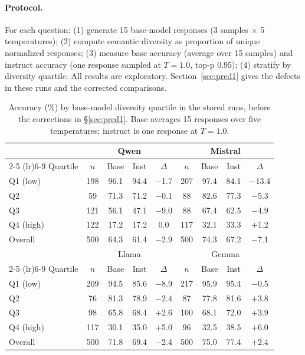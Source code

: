 \paragraph{Protocol.} For each question: (1) generate 15 base-model responses (3 samples $\times$ 5 temperatures); (2) compute semantic diversity as proportion of unique normalized responses; (3) measure base accuracy (average over 15 samples) and instruct accuracy (one response sampled at $T=1.0$, top-p 0.95); (4) stratify by diversity quartile. All results are exploratory. Section~\ref{sec:pred1} gives the defects in these runs and the corrected comparisons.

\begin{table}[h]
\centering
\small
\begin{tabular}{lcccc|cccc}
\toprule
 & \multicolumn{4}{c}{Qwen} & \multicolumn{4}{c}{Mistral} \\
\cmidrule(lr){2-5} \cmidrule(lr){6-9}
Quartile & $n$ & Base & Inst & $\Delta$ & $n$ & Base & Inst & $\Delta$ \\
\midrule
Q1 (low) & 198 & 96.1 & 94.4 & $-$1.7 & 207 & 97.4 & 84.1 & $-$13.4 \\
Q2 & 59 & 71.3 & 71.2 & $-$0.1 & 88 & 82.6 & 77.3 & $-$5.3 \\
Q3 & 121 & 56.1 & 47.1 & $-$9.0 & 88 & 67.4 & 62.5 & $-$4.9 \\
Q4 (high) & 122 & 17.2 & 17.2 & 0.0 & 117 & 32.1 & 33.3 & $+$1.2 \\
Overall & 500 & 64.3 & 61.4 & $-$2.9 & 500 & 74.3 & 67.2 & $-$7.1 \\
\midrule
 & \multicolumn{4}{c}{Llama} & \multicolumn{4}{c}{Gemma} \\
\cmidrule(lr){2-5} \cmidrule(lr){6-9}
Quartile & $n$ & Base & Inst & $\Delta$ & $n$ & Base & Inst & $\Delta$ \\
\midrule
Q1 (low) & 209 & 94.5 & 85.6 & $-$8.9 & 217 & 95.9 & 95.4 & $-$0.5 \\
Q2 & 76 & 81.3 & 78.9 & $-$2.4 & 87 & 77.8 & 81.6 & $+$3.8 \\
Q3 & 98 & 65.8 & 68.4 & $+$2.6 & 100 & 68.1 & 72.0 & $+$3.9 \\
Q4 (high) & 117 & 30.1 & 35.0 & $+$5.0 & 96 & 32.5 & 38.5 & $+$6.0 \\
Overall & 500 & 71.8 & 69.4 & $-$2.4 & 500 & 75.0 & 77.4 & $+$2.4 \\
\bottomrule
\end{tabular}
\caption{Accuracy (\%) by base-model diversity quartile in the stored runs, before the corrections in \S\ref{sec:pred1}. Base averages 15 responses over five temperatures; instruct is one response at $T=1.0$.}
\label{tab:pred1-stored}
\end{table}

